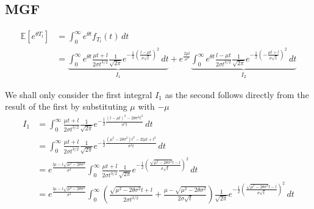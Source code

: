 \documentclass[../Thesis.tex]{subfiles}
\begin{document}
\subsection{MGF}
\begin{align*}
    \mathbb{E}\left[ e^{\theta T_l} \right] & = \int_0^\infty e^{\theta t} f_{T_l}(t)\, dt                                                                                                                                                                                                                                                                                                                                                   \\
                                            & =  \underbrace{\int_0^\infty e^{\theta t} \frac{\mu t + l}{2\sigma t^{3/2}} \frac{1}{\sqrt{2\pi}} e^{-\frac{1}{2}\left(\frac{l - \mu t}{\sigma \sqrt{t}}\right)^2} \, dt}_{I_1} + e^{\frac{2\mu l}{\sigma^2}} \underbrace{ \int_0^\infty  e^{\theta t} \frac{l - \mu t}{2\sigma t^{3/2}} \frac{1}{\sqrt{2\pi}} e^{-\frac{1}{2}\left(- \frac{\mu t + l}{\sigma \sqrt{t}}\right)^2} \, dt}_{I_2}
\end{align*}

We shall only consider the first integral $I_1$ as the second follows directly from the result of the first by substituting $\mu$ with $-\mu$
\begin{align*}
    I_1 & = \int_0^\infty \frac{\mu t + l}{2 \sigma t^{3/2}} \frac{1}{\sqrt{2 \pi}} e^{-\frac{1}{2} \frac{\left(l-\mu t\right)^2 -2\theta \sigma^2 t^2}{\sigma^2 t}} \, dt                                                                                                                                                                                            \\
        & = \int_0^\infty \frac{\mu t + l}{2 \sigma t^{3/2}} \frac{1}{\sqrt{2 \pi}} e^{-\frac{1}{2} \frac{(\mu^2 - 2\theta \sigma^2) t^2   - 2l\mu t + l^2 }{\sigma^2 t}} \, dt                                                                                                                                                                                       \\
        & = e^{\frac{l\mu - l \sqrt{\mu^2 - 2\theta \sigma^2}}{\sigma^2}} \int_0^\infty \frac{\mu t + l}{2 \sigma t^{3/2}} \frac{1}{\sqrt{2 \pi}} e^{-\frac{1}{2} \left( \frac{\sqrt{\mu^2 -  2\theta \sigma^2} t - l}{\sigma \sqrt{t}} \right)^2 } \, dt                                                                                                             \\
        & = e^{\frac{l\mu - l \sqrt{\mu^2 - 2\theta \sigma^2}}{\sigma^2}} \int_0^\infty \left(\frac{\sqrt{\mu^2 - 2 \theta \sigma^2} t + l}{2 \sigma t^{3/2}} + \frac{\mu - \sqrt{\mu^2 - 2\theta \sigma^2}}{2\sigma \sqrt{t}} \right) \frac{1}{\sqrt{2 \pi}} e^{-\frac{1}{2} \left( \frac{\sqrt{\mu^2 -  2\theta \sigma^2} t - l}{\sigma \sqrt{t}} \right)^2 } \, dt \\
\end{align*}
\end{document}
